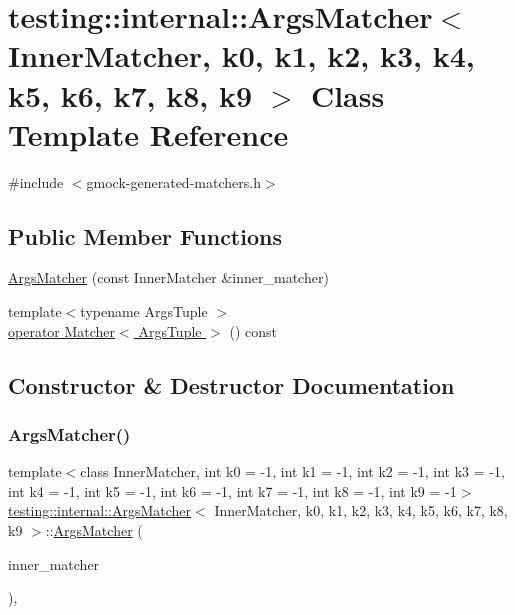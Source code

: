\hypertarget{classtesting_1_1internal_1_1_args_matcher}{}\section{testing\+:\+:internal\+:\+:Args\+Matcher$<$ Inner\+Matcher, k0, k1, k2, k3, k4, k5, k6, k7, k8, k9 $>$ Class Template Reference}
\label{classtesting_1_1internal_1_1_args_matcher}


{\ttfamily \#include $<$gmock-\/generated-\/matchers.\+h$>$}

\subsection*{Public Member Functions}
\begin{DoxyCompactItemize}
\item 
\hyperlink{classtesting_1_1internal_1_1_args_matcher_a2879d7455f2da2a5a2f2b6759dbc0561}{Args\+Matcher} (const Inner\+Matcher \&inner\+\_\+matcher)
\item 
{\footnotesize template$<$typename Args\+Tuple $>$ }\\\hyperlink{classtesting_1_1internal_1_1_args_matcher_ad55698b0de384a9d8875cef5b172cb4a}{operator Matcher$<$ Args\+Tuple $>$} () const
\end{DoxyCompactItemize}


\subsection{Constructor \& Destructor Documentation}
\mbox{\label{classtesting_1_1internal_1_1_args_matcher_a2879d7455f2da2a5a2f2b6759dbc0561}} 
\subsubsection{\texorpdfstring{Args\+Matcher()}{ArgsMatcher()}}
{\footnotesize\ttfamily template$<$class Inner\+Matcher, int k0 = -\/1, int k1 = -\/1, int k2 = -\/1, int k3 = -\/1, int k4 = -\/1, int k5 = -\/1, int k6 = -\/1, int k7 = -\/1, int k8 = -\/1, int k9 = -\/1$>$ \\
\hyperlink{classtesting_1_1internal_1_1_args_matcher}{testing\+::internal\+::\+Args\+Matcher}$<$ Inner\+Matcher, k0, k1, k2, k3, k4, k5, k6, k7, k8, k9 $>$\+::\hyperlink{classtesting_1_1internal_1_1_args_matcher}{Args\+Matcher} (\begin{DoxyParamCaption}\item[{const Inner\+Matcher \&}]{inner\+\_\+matcher }\end{DoxyParamCaption})\hspace{0.3cm}{\ttfamily [inline]}, {\ttfamily [explicit]}}



